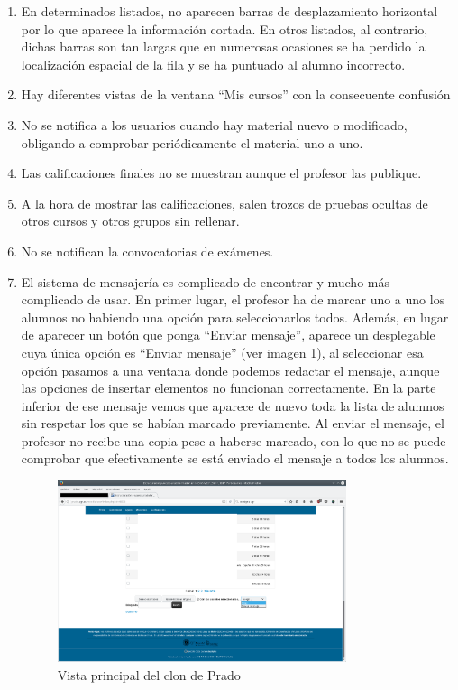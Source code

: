 \begin{enumerate}
\item En determinados listados, no aparecen barras de desplazamiento horizontal por lo que aparece la información cortada. En otros listados, al contrario, dichas barras son tan largas que en numerosas ocasiones se ha perdido la localización espacial de la fila y se ha puntuado al alumno incorrecto.

\item Hay diferentes vistas de la ventana ``Mis cursos'' con la consecuente confusión

\item No se notifica a los usuarios cuando hay material nuevo o modificado, obligando a comprobar periódicamente el material uno a uno.

\item Las calificaciones finales no se muestran aunque el profesor las publique.

\item A la hora de mostrar las calificaciones, salen trozos de pruebas ocultas de otros cursos y otros grupos sin rellenar.

\item No se notifican la convocatorias de exámenes.

\item El sistema de mensajería es complicado de encontrar y mucho más complicado de usar. En primer lugar, el profesor ha de marcar uno a uno los alumnos no habiendo una opción para seleccionarlos todos. Además, en lugar de aparecer un botón que ponga  ``Enviar mensaje'', aparece un desplegable cuya única opción es ``Enviar mensaje'' (ver imagen \ref{fig:pantallazoPradoenviarMensaje}), al seleccionar esa opción pasamos a una ventana donde podemos redactar el mensaje, aunque las opciones de insertar elementos no funcionan correctamente. En la parte inferior de ese mensaje vemos que aparece de nuevo toda la lista de alumnos sin respetar los que se habían marcado previamente. Al enviar el mensaje, el profesor no recibe una copia pese a haberse marcado, con lo que no se puede comprobar que efectivamente se está enviado el mensaje a todos los alumnos. 

\begin{figure}[h!]
\centering
\includegraphics[width=0.8\textwidth]{../screenshots/pantallazoPradoenviarMensaje}
\caption{Vista principal del clon de Prado}
\label{fig:pantallazoPradoenviarMensaje}
\end{figure} 


\end{enumerate}

